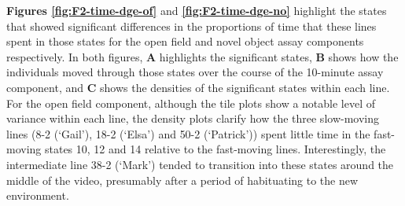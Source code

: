 \documentclass[
]{book}
\begin{document}
\textbf{Figures \ref{fig:F2-time-dge-of}} and \textbf{\ref{fig:F2-time-dge-no}} highlight the states that showed significant differences in the proportions of time that these lines spent in those states for the open field and novel object assay components respectively. In both figures, \textbf{A} highlights the significant states, \textbf{B} shows how the individuals moved through those states over the course of the 10-minute assay component, and \textbf{C} shows the densities of the significant states within each line. For the open field component, although the tile plots show a notable level of variance within each line, the density plots clarify how the three slow-moving lines (\textcolor{8-2 (‘Gail’)_FF699C}{8-2 (‘Gail’)}, \textcolor{18-2 (‘Elsa’)_FF66A6}{18-2 (‘Elsa’)} and \textcolor{50-2 (‘Patrick’)_BB81FF}{50-2 (‘Patrick’)}) spent little time in the fast-moving states 10, 12 and 14 relative to the fast-moving lines. Interestingly, the intermediate line \textcolor{38-2 (‘Mark’)_00C08B}{38-2 (‘Mark’)} tended to transition into these states around the middle of the video, presumably after a period of habituating to the new environment.
\end{document}
